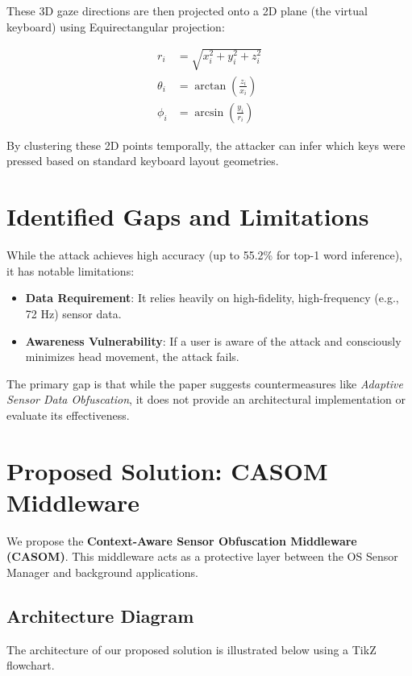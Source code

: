\documentclass[12pt,a4paper]{article}
\begin{document}
These 3D gaze directions are then projected onto a 2D plane (the virtual keyboard) using Equirectangular projection:

\begin{align}
r_i &= \sqrt{x_i^2 + y_i^2 + z_i^2} \\
\theta_i &= \arctan\left(\frac{z_i}{x_i}\right) \\
\phi_i &= \arcsin\left(\frac{y_i}{r_i}\right)
\end{align}

By clustering these 2D points temporally, the attacker can infer which keys were pressed based on standard keyboard layout geometries.

\section{Identified Gaps and Limitations}
While the attack achieves high accuracy (up to 55.2\% for top-1 word inference), it has notable limitations:
\begin{itemize}
    \item \textbf{Data Requirement}: It relies heavily on high-fidelity, high-frequency (e.g., 72 Hz) sensor data.
    \item \textbf{Awareness Vulnerability}: If a user is aware of the attack and consciously minimizes head movement, the attack fails.
\end{itemize}
The primary gap is that while the paper suggests countermeasures like \textit{Adaptive Sensor Data Obfuscation}, it does not provide an architectural implementation or evaluate its effectiveness.

\section{Proposed Solution: CASOM Middleware}
We propose the \textbf{Context-Aware Sensor Obfuscation Middleware (CASOM)}. This middleware acts as a protective layer between the OS Sensor Manager and background applications. 

\subsection{Architecture Diagram}
The architecture of our proposed solution is illustrated below using a TikZ flowchart.
\end{document}
